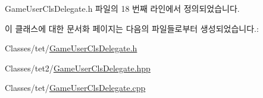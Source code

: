 Game\+User\+Cls\+Delegate.\+h 파일의 18 번째 라인에서 정의되었습니다.



이 클래스에 대한 문서화 페이지는 다음의 파일들로부터 생성되었습니다.\+:\begin{DoxyCompactItemize}
\item 
Classes/tet/\hyperlink{_game_user_cls_delegate_8h}{Game\+User\+Cls\+Delegate.\+h}\item 
Classes/tet2/\hyperlink{_game_user_cls_delegate_8hpp}{Game\+User\+Cls\+Delegate.\+hpp}\item 
Classes/tet/\hyperlink{_game_user_cls_delegate_8cpp}{Game\+User\+Cls\+Delegate.\+cpp}\end{DoxyCompactItemize}
